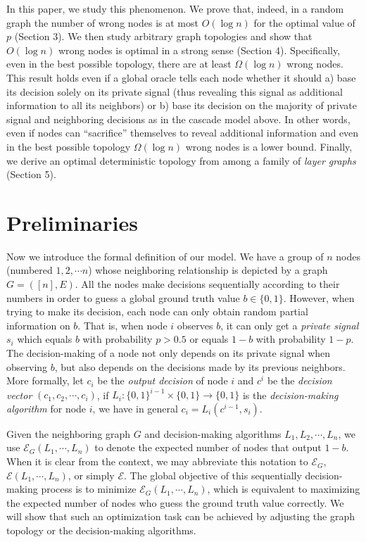 \documentclass[a4paper,UKenglish]{lipics}
\theoremstyle{definition}
\begin{document}
In this paper, we study this phenomenon. 
We prove that, indeed, in a random graph the number of wrong nodes is at most $O(\log n)$ for the optimal value of $p$ (Section 3). 
We then study arbitrary graph topologies and show that $O(\log n)$ wrong nodes is optimal in a strong sense (Section 4). 
Specifically, even in the best possible topology, there are at least $\Omega(\log n)$ wrong nodes. 
This result holds even if a global oracle tells each node whether it should 
	a) base its decision solely on its private signal (thus revealing this signal as additional information to all its neighbors) or 
	b) base its decision on the majority of private signal and neighboring decisions as in the cascade model above. 
In other words, even if nodes can ``sacrifice'' themselves to reveal additional information 
	and even in the best possible topology $\Omega(\log n)$ wrong nodes is a lower bound. 
Finally, we derive an optimal deterministic topology from among a family of \emph{layer graphs} (Section 5).








\section{Preliminaries}

Now we introduce the formal definition of our model. 
We have a group of $n$ nodes (numbered $1,2,\cdots n$) whose neighboring relationship is depicted by a graph $G = ([n],E)$. 
All the nodes make decisions sequentially according to their numbers in order to guess a global ground truth value $b\in\{0,1\}$. 
However, when trying to make its decision, each node can only obtain random partial information on $b$. 
That is, when node $i$ observes $b$, 
	it can only get a \emph{private signal} $s_i$ which equals $b$ with probability $p>0.5$ or equals $1-b$ with probability $1-p$.  
The decision-making of a node not only depends on its private signal when observing $b$, 
	but also depends on the decisions made by its previous neighbors. 
More formally, let $c_i$ be the \emph{output decision} of node $i$ and $c^i$ be the \emph{decision vector} $(c_1, c_2, \cdots, c_i)$, 
	if $ L_i : \{0,1\}^{i-1}\times \{0,1\} \to \{0,1\} $ is the \emph{decision-making algorithm} for node $i$,  we have in general $c_i = L_i(c^{i-1}, s_i)$.

Given the neighboring graph $G$ and decision-making algorithms $L_1, L_2, \cdots, L_n$, 
	we use $\mathcal{E}_G(L_1, \dotsb, L_n)$ to denote the expected number of nodes that output $1 - b$. 
When it is clear from the context, we may abbreviate this notation to $\mathcal{E}_G$,
	$\mathcal{E}(L_1, \dotsb, L_n)$, or simply $\mathcal{E}$. 
The global objective of this sequentially decision-making process is to minimize $\mathcal{E}_G(L_1, \dotsb, L_n)$, 
	which is equivalent to maximizing the expected number of nodes who guess the ground truth value correctly. 
We will show that such an optimization task can be achieved by adjusting the graph topology or the decision-making algorithms. 
\end{document}
